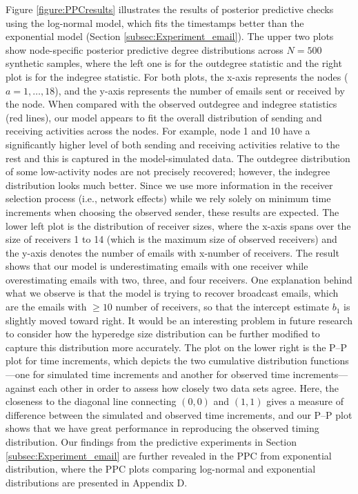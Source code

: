 \documentclass[ba]{imsart}
\numberwithin{equation}{section}
\theoremstyle{plain}
\begin{document}
	Figure \ref{figure:PPCresults} illustrates the results of posterior predictive checks using the log-normal model, which fits the timestamps better than the exponential model (Section \ref{subsec:Experiment_email}). The upper two plots show node-specific posterior predictive degree distributions across $N=500$ synthetic samples, where the left one is for the outdegree statistic and the right plot is for the indegree statistic. For both plots, the x-axis represents the nodes ($a=1,\ldots,18$), and the y-axis represents the number of emails sent or received by the node. When compared with the observed outdegree and indegree statistics (red lines), our model appears to fit the overall distribution of sending and receiving activities across the nodes. For example, node 1 and 10 have a significantly higher level of both sending and receiving activities relative to the rest and this is captured in the model-simulated data. The outdegree distribution of some low-activity nodes are not precisely recovered; however, the  indegree distribution looks much better. Since we use more information in the receiver selection process (i.e., network effects) while we rely solely on minimum time increments when choosing the observed sender, these results are expected. The lower left plot is the distribution of receiver sizes, where the x-axis spans over the size of receivers 1 to 14 (which is the maximum size of observed receivers) and the y-axis denotes the number of emails with x-number of receivers. The result shows that our model is underestimating emails with one receiver while overestimating emails with two, three, and four receivers. One explanation behind what we observe is that the model is trying to recover broadcast emails, which are the emails with $\geq 10$ number of receivers, so that the intercept estimate $b_1$ is slightly moved toward right. It would be an interesting problem in future research to consider how the hyperedge size distribution can be further modified to capture this distribution more accurately. The plot on the lower right is the P--P plot for time increments, which depicts the two cumulative distribution functions---one for simulated time increments and another for observed time increments---against each other in order to assess how closely two data sets agree. Here, the closeness to the diagonal line connecting $(0, 0)$ and $(1, 1)$ gives a measure of difference between the simulated and observed time increments, and our P--P plot shows that we have great performance in reproducing the observed timing distribution. Our findings from the predictive experiments in Section \ref{subsec:Experiment_email} are further revealed in the PPC from exponential distribution, where the PPC plots comparing log-normal and exponential distributions are presented in Appendix D.
	
\end{document}
